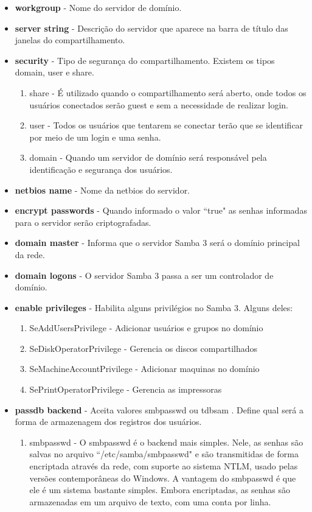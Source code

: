 \begin{itemize}
	\item \textbf{workgroup} - Nome do servidor de domínio.
	\item \textbf{server string} - Descrição do servidor que aparece na barra de título das janelas do compartilhamento.
	\item \textbf{security} - Tipo de segurança do compartilhamento. Existem os tipos domain, user e share.
		\begin{enumerate}
			\item {share}  - É utilizado quando o compartilhamento será aberto, onde todos os usuários conectados serão guest e sem a necessidade de realizar login.
			\item {user} - Todos os usuários que tentarem se conectar terão que se identificar por meio de um login e uma senha.
			\item {domain} - Quando um servidor de domínio será responsável pela identificação e segurança dos usuários.
		\end{enumerate} 
	\item \textbf{netbios name} - Nome da netbios do servidor.
	\item \textbf{encrypt passwords} - Quando informado o valor ``true" as senhas informadas para o servidor serão criptografadas.
	\item \textbf{domain master} - Informa que o servidor Samba 3 será o domínio principal da rede.
	\item \textbf{domain logons} - O servidor Samba 3 passa a ser um controlador de domínio.
	\item \textbf{enable privileges} - Habilita alguns privilégios no Samba 3. Alguns deles:
		\begin{enumerate}
			\item {SeAddUsersPrivilege} - Adicionar usuários e grupos no domínio 
			\item {SeDiskOperatorPrivilege} - Gerencia os discos compartilhados 
			\item {SeMachineAccountPrivilege} - Adicionar maquinas no domínio 
			\item {SePrintOperatorPrivilege} - Gerencia as impressoras
		\end{enumerate}
	\item \textbf{passdb backend} - Aceita valores smbpasswd ou tdbsam . Define qual será a forma de armazenagem dos registros dos usuários.
		\begin{enumerate}
			\item{smbpasswd} - O smbpasswd é o backend mais simples. Nele, as senhas são salvas no arquivo ``/etc/samba/smbpasswd" e são transmitidas de forma encriptada através da rede, com suporte ao sistema NTLM, usado pelas versões contemporâneas do Windows. A vantagem do smbpasswd é que ele é um sistema bastante simples. Embora encriptadas, as senhas são armazenadas em um arquivo de texto, com uma conta por linha.\cite{BACKEND}

\end{enumerate}
\end{itemize}
